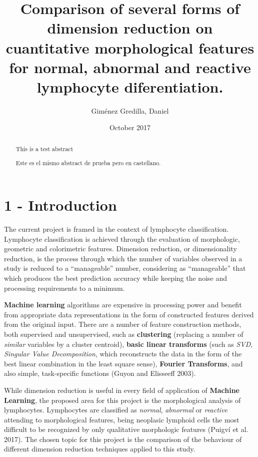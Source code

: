 \documentclass[]{article}
\title{Comparison of several forms of dimension reduction on cuantitative
morphological features for normal, abnormal and reactive lymphocyte
diferentiation.}
\author{Giménez Gredilla, Daniel}
\date{October 2017}
\newenvironment{Shaded}{\begin{snugshade}}{\end{snugshade}}
\newcommand{\KeywordTok}[1]{\textcolor[rgb]{0.13,0.29,0.53}{\textbf{{#1}}}}
\newcommand{\DataTypeTok}[1]{\textcolor[rgb]{0.13,0.29,0.53}{{#1}}}
\newcommand{\StringTok}[1]{\textcolor[rgb]{0.31,0.60,0.02}{{#1}}}
\newcommand{\NormalTok}[1]{{#1}}
\begin{document}
\maketitle

\begin{abstract}
This is a test abstract \par Este es el mismo abstract de prueba pero en
castellano. \pagebreak
\end{abstract}

{
\hypersetup{linkcolor=black}
\setcounter{tocdepth}{3}
\tableofcontents
}
\begin{Shaded}
\end{Shaded}

\pagebreak  

\section{1 - Introduction}\label{introduction}

The current project is framed in the context of lymphocyte
classification. Lymphocyte classification is achieved through the
evaluation of morphologic, geometric and colorimetric features.
Dimension reduction, or dimensionality reduction, is the process through
which the number of variables observed in a study is reduced to a
``manageable'' number, considering as ``manageable'' that which produces
the best prediction accuracy while keeping the noise and processing
requirements to a minimum.

\textbf{Machine learning} algorithms are expensive in processing power
and benefit from appropriate data representations in the form of
constructed features derived from the original input. There are a number
of feature construction methods, both supervised and unsupervised, such
as \textbf{clustering} (replacing a number of \emph{similar} variables
by a cluster centroid), \textbf{basic linear transforms} (such as
\emph{SVD}, \emph{Singular Value Decomposition}, which reconstructs the
data in the form of the best linear combination in the least square
sense), \textbf{Fourier Transforms}, and also simple, task-specific
functions (Guyon and Elisseeff 2003).

While dimension reduction is useful in every field of application of
\textbf{Machine Learning}, the proposed area for this project is the
morphological analysis of lymphocytes. Lymphocytes are classified as
\emph{normal}, \emph{abnormal} or \emph{reactive} attending to
morphological features, being neoplasic lymphoid cells the most
difficult to be recognized by only qualitative morphologic features
(Puigv{í} et al. 2017). The chosen topic for this project is the
comparison of the behaviour of different dimension reduction techniques
applied to this study.
\end{document}

